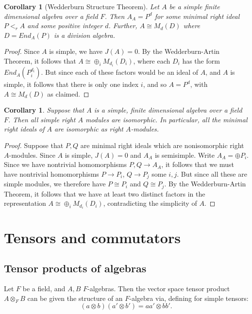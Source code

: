 \documentclass[12pt]{report}
\theoremstyle{plain}
\newtheorem{cor}[thm]{Corollary}
\begin{document}
\begin{cor}[Wedderburn Structure Theorem]
Let $A$ be a simple finite dimensional algebra over a field $F$. Then $A_A
= P^d$ for some minimal right ideal $P <_r A$ and some positive integer $d$.
Further, $A
\cong M_d(D)$ where $D = End_A(P)$ is a division algebra.
\end{cor}
\begin{proof}
Since $A$ is simple, we have $J(A) = 0$. By the Wedderburn-Artin Theorem,
it follows that $A \cong \oplus_i M_{d_i}(D_i)$, where each $D_i$ has the
form $End_A(P_i^{d_i})$. But since each of these factors would be an ideal
of $A$, and $A$ is simple, it follows that there is only one index $i$, and
so $A = P^d$, with $A \cong M_d(D)$ as claimed.
\end{proof}

\begin{cor} \label{simple wedderburn}
Suppose that $A$ is a simple, finite dimensional algebra over a field $F$.
Then all simple right $A$ modules are isomorphic. In particular, all the
minimal right ideals of $A$ are isomorphic as right $A$-modules.
\end{cor}
\begin{proof}
Suppose that $P, Q$ are minimal right ideals which are nonisomorphic right
$A$-modules.  Since $A$ is simple, $J(A) = 0$ and $A_A$ is semisimple.
Write $A_A = \oplus P_i$. Since we have nontrivial homomorphisms $P, Q \to
A_A$, it follows that we must have nontrivial homomorphisms $P \to P_i$,
$Q \to P_j$ some $i, j$. But since all these are simple modules, we
therefore have $P \cong P_i$ and $Q \cong P_j$. By the Wedderburn-Artin
Theorem, it follows that we have at least two distinct factors in the
representation $A \cong \oplus_i M_{d_i}(D_i)$, contradicting the
simplicity of $A$.
\end{proof}

\chapter{Tensors and commutators}

\section{Tensor products of algebras}

Let $F$ be a field, and $A, B$ $F$-algebras. Then the vector space tensor
product $A \otimes_F B$ can be given the structure of an $F$-algebra via,
defining for simple tensors:
\[(a \otimes b)(a' \otimes b') = aa' \otimes bb'.\]
\end{document}
